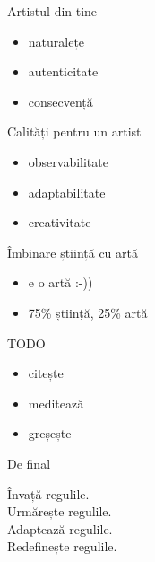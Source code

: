 \documentclass{simple}
\begin{document}
\begin{frame}{Artistul din tine}
  \begin{itemize}
    \pause
    \item naturalețe
    \pause
    \item autenticitate
    \pause
    \item consecvență
  \end{itemize}
\end{frame}

\begin{frame}{Calități pentru un artist}
  \begin{itemize}
    \pause
    \item observabilitate
    \pause
    \item adaptabilitate
    \pause
    \item creativitate
  \end{itemize}
\end{frame}

\begin{frame}{Îmbinare știință cu artă}
  \begin{itemize}
    \item e o artă :-))
    \item 75\% știință, 25\% artă
  \end{itemize}
\end{frame}

\begin{frame}{TODO}
  \begin{itemize}
    \pause
    \item citește
    \pause
    \item meditează
    \pause
    \item greșește
  \end{itemize}
\end{frame}

\begin{frame}{De final}
  \begin{center}
    \pause
    Învață regulile.\\
    \vspace{0.5cm}
    \pause
    Urmărește regulile.\\
    \vspace{0.5cm}
    \pause
    Adaptează regulile.\\
    \vspace{0.5cm}
    \pause
    Redefinește regulile.
  \end{center}
\end{frame}
\end{document}
